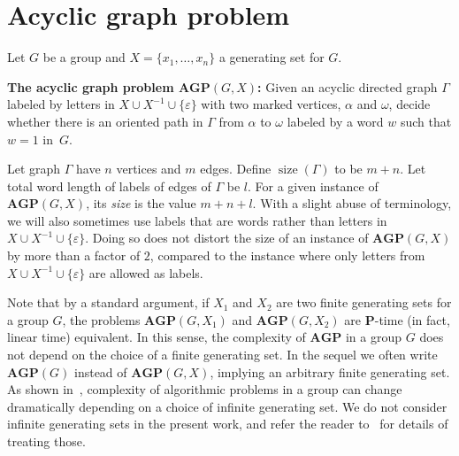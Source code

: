 \documentclass[10pt]{amsart}
\theoremstyle{definition}
\DeclareMathOperator{\size}{{size}}
\def\P{{\mathbf{P}}}
\def\AGP{{\mathbf{AGP}}}
\begin{document}
\section{Acyclic graph problem}\label{sec:agp}
Let $G$ be a group and $X=\{x_1,\ldots,x_n\}$ a generating set for $G$.

%

\medskip
\noindent
{\bf The acyclic graph problem $\AGP(G,X)$\index{$\AGP(G,X)$}:}
Given an acyclic directed graph $\Gamma$ labeled by letters in $X\cup X^{-1}\cup \{\varepsilon\}$ with two marked vertices, $\alpha$ and $\omega$, decide whether there is an oriented path in $\Gamma$ from $\alpha$ to $\omega$ labeled by a word $w$ such that $w=1$ in~$G$.

\medskip
Let graph $\Gamma$ have $n$ vertices and $m$ edges. Define $\size(\Gamma)$ to be $m+n$. Let total word length of labels of edges of $\Gamma$ be $l$. For a given instance of $\AGP(G,X)$, its {\em size} is the value $m+n+l$. With a slight abuse of terminology, we will also sometimes use labels that are words rather than letters in $X\cup X^{-1}\cup\{\varepsilon\}$. Doing so does not distort the size of an instance of $\AGP(G,X)$ by more than a factor of $2$, compared to the instance where only letters from $X\cup X^{-1}\cup\{\varepsilon\}$ are allowed as labels.

Note that by a standard argument, if $X_1$ and $X_2$ are two finite generating sets for a group $G$, the problems $\AGP(G,X_1)$ and $\AGP(G,X_2)$ are $\P$-time (in fact, linear time) equivalent. In this sense, the complexity  of $\AGP$ in a group $G$ does not depend on the choice of a finite generating set. In the sequel we often write $\AGP(G)$ instead of $\AGP(G,X)$, implying an arbitrary finite generating set.
As shown in~\cite{Miasnikov-Nikolaev-Ushakov:2014a}, complexity of algorithmic problems in a group can change dramatically depending on a choice of infinite generating set. We do not consider infinite generating sets in the present work, and refer the reader to~\cite{Miasnikov-Nikolaev-Ushakov:2014a} for details of treating those.
\end{document}
